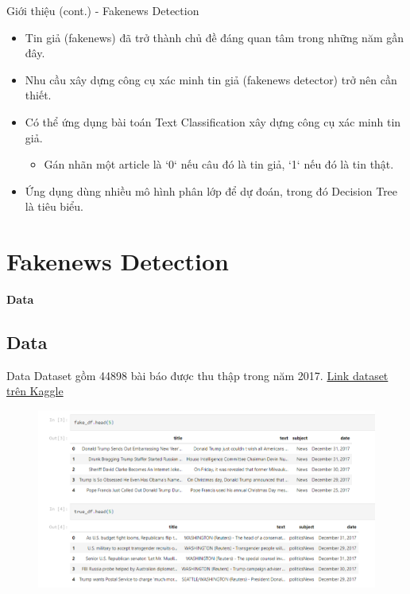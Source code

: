\documentclass[aspectratio=169,xcolor=dvipsnames]{beamer}
\begin{document}
\begin{frame}{Giới thiệu (cont.) - Fakenews Detection}
\begin{itemize}
\item Tin giả (fakenews) đã trở thành chủ đề đáng quan tâm trong những năm gần đây.
\item Nhu cầu xây dựng công cụ xác minh tin giả (fakenews detector) trở nên cần thiết.
\item Có thể ứng dụng bài toán Text Classification xây dựng công cụ xác minh tin giả.
\begin{itemize}
    \item Gán nhãn một article là `0` nếu câu đó là tin giả, `1` nếu đó là tin thật.
\end{itemize}
\item Ứng dụng dùng nhiều mô hình phân lớp để dự đoán, trong đó Decision Tree là tiêu biểu.
\end{itemize}
\end{frame}

\section{Fakenews Detection}
\begin{frame}
	\Huge{\centerline{\textbf{Data}}}
\end{frame}

\subsection{Data}
\begin{frame}{Data}
Dataset gồm 44898 bài báo được thu thập trong năm 2017. \href{https://www.kaggle.com/datasets/clmentbisaillon/fake-and-real-news-dataset}{Link dataset trên Kaggle}
\begin{figure}
\includegraphics[width=0.8\linewidth]{img/quick-glance-at-data.PNG}
\end{figure}
\end{frame}
\end{document}
